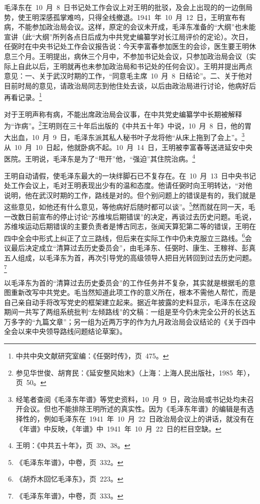毛泽东在~10~月~8~日书记处工作会议上对王明的批驳，及会上出现的的一边倒局势，使王明深感孤掌难呜，只得全线撤退。1941~年~10~月~12~日，王明宣布有病，不能参加政治局会议。这样，原定的会议未开成，毛泽东准备的“大纲”也未能宣讲（此“大纲”所列各点日后成为中共党史编纂学对长江局评价的定论）。次日，任弼时在中央书记处工作会议报告说：今天李富春参加医生的会诊，医生要王明休息三个月。王明提出，病休三个月中，不参加书记处会议，只参加政治局会议（实际上自此以后，王明就再也未参加政治局和书记处的任何会议）。王明并提出两点意见：一、关于武汉时期的工作，“同意毛主席~10~月~8~日结论”。二、关于他对目前时局的意见，请政治局同志到他住处去谈，以后由政治局进行讨论，他病好后再看记录。\footnote{中共中央文献研究室编：《任弼时传》，页~475。}

对于王明声称有病，不能出席政治局会议事，在中共党史编纂学中长期被解释为“诈病”。\footnote{参见华世俊、胡育民：《延安整风始末》（上海：上海人民出版社，1985~年），页~50。}王明则在三十年后出版的《中共五十年》中说，10~月~8~日，他的胃大出血，10~月~9~日，毛泽东派其私人秘书叶子龙将他“从床上拖到了会上”。\footnote{经笔者查阅《毛泽东年谱》等党史资料，10~月~9~日，政治局或书记处均未召开会议。但也不能排除王明所述的真实性。因为《毛泽东年谱》的编辑是有选择性的，例如毛泽东在~1941~年~10~月~22~日政治局会议上的讲话，就没有在《年谱》中反映，《年谱》中~1941~年~10~月~22~日的栏目空缺。}从~10~月~10~日起，他就卧病不起。10~月~14~日，王明被李富春等送进延安中央医院。王明说，毛泽东是为了“甩开”他，“强迫”其住院治病。\footnote{王明：《中共五十年》，页~39、38。}

王明自动请假，使毛泽东最大的一块绊脚石已不复存在。在~10~月~13~日中央书记处工作会议上，毛对王明表现出少有的温和态度。他请任弼时向王明转达，“对他说明，他在武汉时期的工作，路线是对的。但个别问题上的错误是有的，我们就是这些意见，如他还有什么意见，等他病好后随时都可以谈”。\footnote{《毛泽东年谱》，中卷，页~332。}然而就在同一天，毛一改数日前宣布的停止讨论“苏维埃后期错误”的决定，再谈过去历史问题。毛说，苏维埃运动后期错误的主要负责者是博古同志，张闻天算犯第二等的错误，王明在四中全会中形式上纠正了立三路线，但后来在实际工作中仍未克服立三路线。\footnote{《胡乔木回忆毛泽东》，页~223。}会议最后决定成立“清算过去历史委员会”，由毛泽东、任弼时、康生、王稼祥、彭真五人组成，以毛泽东为首，再次引导党的高级领导人把目光转回到过去历史问题。\footnote{《毛泽东年谱》，中卷，页~333。}

以毛泽东为首的“清算过去历史委员会”的工作任务并不复杂，其实就是根据毛的意图重新改写中共党史。毛当然知道此项工作的意义所在，根本不需他人帮忙，而是自己亲自动手将改写党史的框架建立起来。据近年披露的史料显示，毛泽东在这段期间一共写了两组系统批判“左倾路线”的文稿：一组是至今仍未完全公开的长达五万多字的“九篇文章”；另一组为近两万字的作为九月政治局会议结论的《关于四中全会以来中央领导路线问题结论草案》。

